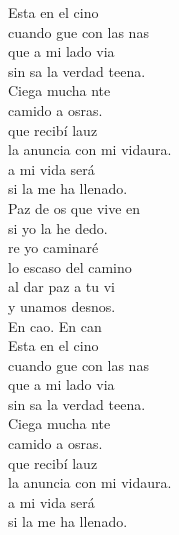 \documentclass[12pt]{article}
\begin{document}
\begin{multicols*}{2}
\begin{cancion}%
	Esta en el cino \\
	cuando gue con las nas\\
	 que a mi lado via \\
	sin sa la verdad teena.\\
\jump
	Ciega mucha nte \\
	camido a osras.\\
	que recibí lauz \\
	la anuncia con mi vidaura.\\
\jump
	a mi vida será\\
	si la  me ha llenado. \\
	Paz de os que vive en  \\
	si yo la he dedo.\\
\jump
	re yo caminaré \\
	lo escaso del camino\\
	al dar  paz a tu vi \\
	y unamos desnos.\\
\jump
	En cao. En can\\
\jump
	Esta en el cino \\
	cuando gue con las nas\\
	 que a mi lado via \\
	sin sa la verdad teena.\\
\jump
	Ciega mucha nte \\
	camido a osras.\\
	que recibí lauz \\
	la anuncia con mi vidaura.\\
\jump
	a mi vida será\\
	si la  me ha llenado. \\

\end{cancion}
\end{multicols*}
\end{document}
